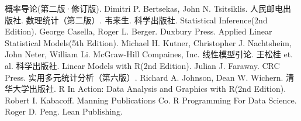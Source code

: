 \begin{thebibliography}{99}
    概率导论(第二版·修订版). Dimitri P. Bertsekas, John N. Tsitsiklis. 人民邮电出版社.
    数理统计（第二版）. 韦来生. 科学出版社.
    Statistical Inference(2nd Edition). George Casella, Roger L. Berger. Duxbury Press.
    Applied Linear Statistical Models(5th Edition). Michael H. Kutner, Christopher J. Nachtsheim, John Neter, William Li. McGraw-Hill Compaines, Inc.
    线性模型引论. 王松桂 et. al. 科学出版社.
    Linear Models with R(2nd Edition). Julian J. Faraway. CRC Press.
    实用多元统计分析（第六版）. Richard A. Johnson, Dean W. Wichern. 清华大学出版社.
    R In Action: Data Analysis and Graphics with R(2nd Edition). Robert I. Kabacoff. Manning Publications Co.
    R Programming For Data Science. Roger D. Peng. Lean Publishing.











\end{thebibliography}